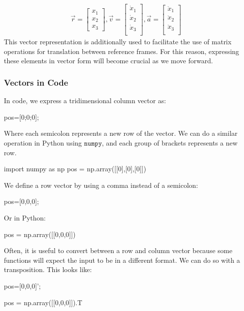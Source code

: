 \documentclass[10pt, openany, titlepage]{book}
\theoremstyle{definition}
\begin{document}
\begin{gather}
    \vec{r}=\begin{bmatrix}
        x_1\\
        x_2\\
        x_3
    \end{bmatrix},
    \vec{v}=\begin{bmatrix}
        \dot{x}_1\\
        \dot{x}_2\\
        \dot{x}_3\\
    \end{bmatrix},
        \vec{a}=\begin{bmatrix}
        \ddot{x}_1\\
        \ddot{x}_2\\
        \ddot{x}_3\\
    \end{bmatrix}
\end{gather}
This vector representation is additionally used to facilitate the use of matrix operations for translation between reference frames. For this reason, expressing these elements in vector form will become crucial as we move forward.

\subsubsection{Vectors in Code}
In code, we express a tridimensional column vector as:
\begin{matlabscript}{}
pos=[0;0;0];
\end{matlabscript}

Where each semicolon represents a new row of the vector. We can do a similar operation in Python using $\texttt{numpy}$, and each group of brackets represents a new row.
\begin{pythonscript}{}
import numpy as np
pos = np.array([[0],[0],[0]])
\end{pythonscript}

We define a row vector by using a comma instead of a semicolon: 
\begin{matlabscript}{}
pos=[0,0,0];
\end{matlabscript}
Or in Python:
\begin{pythonscript}{}
pos = np.array([[0,0,0]])
\end{pythonscript}

Often, it is useful to convert between a row and column vector because some functions will expect the input to be in a different format. We can do so with a transposition. This looks like: 
\begin{matlabscript}{}
pos=[0,0,0]';
\end{matlabscript}
\begin{pythonscript}{}
pos = np.array([[0,0,0]]).T
\end{pythonscript}
\end{document}
